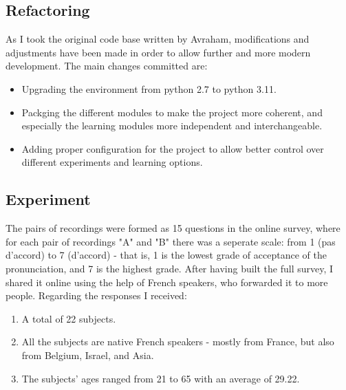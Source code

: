 \documentclass{article}
\begin{document}
\subsection{Refactoring}
As I took the original code base written by Avraham, modifications and adjustments have been made in order to allow further and more modern development. The main changes committed are:
\begin{itemize}
  \item Upgrading the environment from python 2.7 to python 3.11.
  \item Packging the different modules to make the project more coherent, and especially the learning modules more independent and interchangeable.
  \item Adding proper configuration for the project to allow better control over different experiments and learning options.
\end{itemize}


\subsection{Experiment}
The pairs of recordings were formed as 15 questions in the online survey, where for each pair of recordings "A" and "B" there was a seperate scale: from 1 (pas d'accord) to 7 (d'accord) - that is, 1 is the lowest grade of acceptance of the pronunciation, and 7 is the highest grade. After having built the full survey,  I shared it online using the help of French speakers, who forwarded it to more people.  
Regarding the responses I received:
\begin{enumerate}
  \item A total of 22 subjects.
  \item All the subjects are native French speakers - mostly from France, but also from Belgium, Israel,  and Asia.
  \item The subjects’ ages ranged from 21 to 65 with an average of 29.22.
\end{enumerate}
\end{document}
